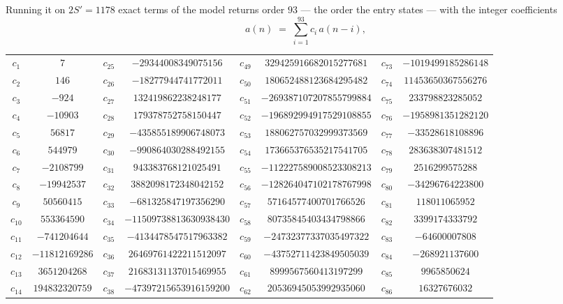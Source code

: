\documentclass[11pt,a4paper]{article}
\theoremstyle{plain}
\theoremstyle{definition}
\begin{document}
Running it on $2S'=1178$ exact terms of the model returns order $93$ --- the order the
entry states --- with the integer coefficients
\[
a(n)\;=\;\sum_{i=1}^{93}c_i\,a(n-i),
\]
\begin{center}\small
\begin{tabular}{cccccccc}
$c_{1}$ & $7$ & $c_{25}$ & $-29344008349075156$ & $c_{49}$ & $329425916682015277681$ & $c_{73}$ & $-1019499185286148$ \\
$c_{2}$ & $146$ & $c_{26}$ & $-18277944741772011$ & $c_{50}$ & $180652488123684295482$ & $c_{74}$ & $11453650367556276$ \\
$c_{3}$ & $-924$ & $c_{27}$ & $132419862238248177$ & $c_{51}$ & $-269387107207855799884$ & $c_{75}$ & $233798823285052$ \\
$c_{4}$ & $-10903$ & $c_{28}$ & $179378752758150447$ & $c_{52}$ & $-196892994917529108855$ & $c_{76}$ & $-1958981351282120$ \\
$c_{5}$ & $56817$ & $c_{29}$ & $-435855189906748073$ & $c_{53}$ & $188062757032999373569$ & $c_{77}$ & $-33528618108896$ \\
$c_{6}$ & $544979$ & $c_{30}$ & $-990864030288492155$ & $c_{54}$ & $173665376535217541705$ & $c_{78}$ & $283638307481512$ \\
$c_{7}$ & $-2108799$ & $c_{31}$ & $943383768121025491$ & $c_{55}$ & $-112227589008523308213$ & $c_{79}$ & $2516299575288$ \\
$c_{8}$ & $-19942537$ & $c_{32}$ & $3882098172348042152$ & $c_{56}$ & $-128264047102178767998$ & $c_{80}$ & $-34296764223800$ \\
$c_{9}$ & $50560415$ & $c_{33}$ & $-681325847197356290$ & $c_{57}$ & $57164577400701766526$ & $c_{81}$ & $118011065952$ \\
$c_{10}$ & $553364590$ & $c_{34}$ & $-11509738813630938430$ & $c_{58}$ & $80735845403434798866$ & $c_{82}$ & $3399174333792$ \\
$c_{11}$ & $-741204644$ & $c_{35}$ & $-4134478547517963382$ & $c_{59}$ & $-24732377337035497322$ & $c_{83}$ & $-64600007808$ \\
$c_{12}$ & $-11812169286$ & $c_{36}$ & $26469761422211512097$ & $c_{60}$ & $-43752711423849505039$ & $c_{84}$ & $-268921137600$ \\
$c_{13}$ & $3651204268$ & $c_{37}$ & $21683131137015469955$ & $c_{61}$ & $8999567560413197299$ & $c_{85}$ & $9965850624$ \\
$c_{14}$ & $194832320759$ & $c_{38}$ & $-47397215653916159200$ & $c_{62}$ & $20536945053992935060$ & $c_{86}$ & $16327676032$ \\

\end{tabular}
\end{center}
\end{document}
